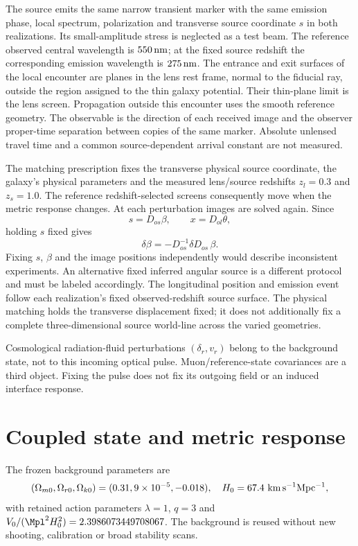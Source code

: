 The source emits the same narrow transient marker with the same emission
phase, local spectrum, polarization and transverse source coordinate $s$ in both
realizations. Its small-amplitude stress is neglected as a test beam.
The reference observed central wavelength is $550\,{\rm nm}$; at the fixed
source redshift the corresponding emission wavelength is $275\,{\rm nm}$.
The entrance and exit surfaces of the local encounter are planes in the
lens rest frame, normal to the fiducial ray, outside the region assigned
to the thin galaxy potential. Their thin-plane limit is the lens screen.
Propagation outside this encounter uses the smooth reference geometry.
The observable is the direction of each received image and the observer
proper-time separation between copies of the same marker. Absolute
unlensed travel time and a common source-dependent arrival constant are
not measured.

The matching prescription fixes the transverse physical source coordinate,
the galaxy's physical parameters and the measured lens/source redshifts
$z_l=0.3$ and $z_s=1.0$. The reference redshift-selected screens consequently
move when the metric response changes. At each perturbation images are
solved again. Since
\begin{equation}
 s=D_{os}\beta,\qquad x=D_{ol}\theta,
 \label{eq:sl-source}
\end{equation}
holding $s$ fixed gives
\begin{equation}
 \delta\beta=-D_{os}^{-1}\delta D_{os}\,\beta.
 \label{eq:sl-deltabeta}
\end{equation}
Fixing $s$, $\beta$ and the image positions independently would describe
inconsistent experiments. An alternative fixed inferred angular source
is a different protocol and must be labeled accordingly.
The longitudinal position and emission event follow each realization's
fixed observed-redshift source surface. The physical matching holds the
transverse displacement fixed; it does not additionally fix a complete
three-dimensional source world-line across the varied geometries.

Cosmological radiation-fluid perturbations $(\delta_r,v_r)$ belong to the
background state, not to this incoming optical pulse. Muon/reference-state
covariances are a third object. Fixing the pulse does not fix its outgoing
field or an induced interface response.

\section{Coupled state and metric response}
\label{sec:sl-coupled}
The frozen background parameters are
\begin{equation}
 (\Omega_{m0},\Omega_{r0},\Omega_{k0})=(0.31,9\times10^{-5},-0.018),
 \quad H_0=67.4\ {\rm km\,s^{-1}Mpc^{-1}},
\end{equation}
with retained action parameters $\lambda=1$, $q=3$ and
$V_0/(\Mpl^2H_0^2)=2.3986073449708067$. The background is reused without
new shooting, calibration or broad stability scans.

